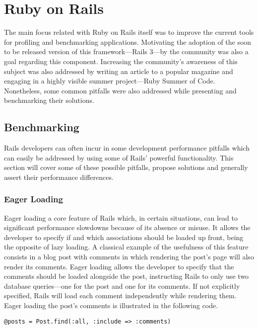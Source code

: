 \section{Ruby on Rails} %
\label{solution:sec:ruby_on_rails}
The main focus related with Ruby on Rails itself was to improve the current tools for profiling and benchmarking applications. Motivating the adoption of the soon to be released version of this framework---Rails 3---by the community was also a goal regarding this component. Increasing the community's awareness of this subject was also addressed by writing an article to a popular magazine and engaging in a highly visible summer project---Ruby Summer of Code. Nonetheless, some common pitfalls were also addressed while presenting and benchmarking their solutions.

\begin{comment}
Create tools to improve Rails

Push the Rails community forward
\end{comment}

\subsection{Benchmarking}
Rails developers can often incur in some development performance pitfalls which can easily be addressed by using some of Rails' powerful functionality. This section will cover some of these possible pitfalls, propose solutions and generally assert their performance differences.

\subsubsection{Eager Loading}
Eager loading a core feature of Rails which, in certain situations, can lead to significant performance slowdowns because of its absence or misuse. It allows the developer to specify if and which associations should be loaded up front, being the opposite of lazy loading. A classical example of the usefulness of this feature consists in a blog post with comments in which rendering the post's page will also render its comments. Eager loading allows the developer to specify that the comments should be loaded alongside the post, instructing Rails to only use two database queries---one for the post and one for its comments. If not explicitly specified, Rails will load each comment independently while rendering them. Eager loading the post's comments is illustrated in the following code.
\begin{lstlisting}[xleftmargin=30pt,xrightmargin=30pt]
@posts = Post.find(:all, :include => :comments)
\end{lstlisting}

